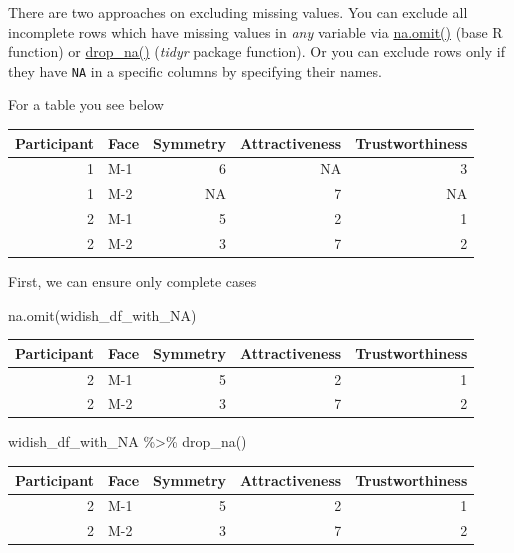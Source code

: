 \documentclass[
]{book}
\newenvironment{Shaded}{\begin{snugshade}}{\end{snugshade}}
\newcommand{\FunctionTok}[1]{\textcolor[rgb]{0.00,0.00,0.00}{#1}}
\newcommand{\NormalTok}[1]{#1}
\newcommand{\SpecialCharTok}[1]{\textcolor[rgb]{0.00,0.00,0.00}{#1}}
\begin{document}
There are two approaches on excluding missing values. You can exclude all incomplete rows which have missing values in \emph{any} variable via \href{https://stat.ethz.ch/R-manual/R-devel/library/stats/html/na.fail.html}{na.omit()} (base R function) or \href{https://tidyr.tidyverse.org/reference/drop_na.html}{drop\_na()} (\emph{tidyr} package function). Or you can exclude rows only if they have \texttt{NA} in a specific columns by specifying their names.

For a table you see below

\begin{tabular}{r|l|r|r|r}
\hline
Participant & Face & Symmetry & Attractiveness & Trustworthiness\\
\hline
1 & M-1 & 6 & NA & 3\\
\hline
1 & M-2 & NA & 7 & NA\\
\hline
2 & M-1 & 5 & 2 & 1\\
\hline
2 & M-2 & 3 & 7 & 2\\
\hline
\end{tabular}

First, we can ensure only complete cases

\begin{Shaded}
\begin{Highlighting}[]
\FunctionTok{na.omit}\NormalTok{(widish\_df\_with\_NA)}
\end{Highlighting}
\end{Shaded}

\begin{tabular}{r|l|r|r|r}
\hline
Participant & Face & Symmetry & Attractiveness & Trustworthiness\\
\hline
2 & M-1 & 5 & 2 & 1\\
\hline
2 & M-2 & 3 & 7 & 2\\
\hline
\end{tabular}

\begin{Shaded}
\begin{Highlighting}[]
\NormalTok{widish\_df\_with\_NA }\SpecialCharTok{\%\textgreater{}\%}
  \FunctionTok{drop\_na}\NormalTok{()}
\end{Highlighting}
\end{Shaded}

\begin{tabular}{r|l|r|r|r}
\hline
Participant & Face & Symmetry & Attractiveness & Trustworthiness\\
\hline
2 & M-1 & 5 & 2 & 1\\
\hline
2 & M-2 & 3 & 7 & 2\\
\hline
\end{tabular}
\end{document}
